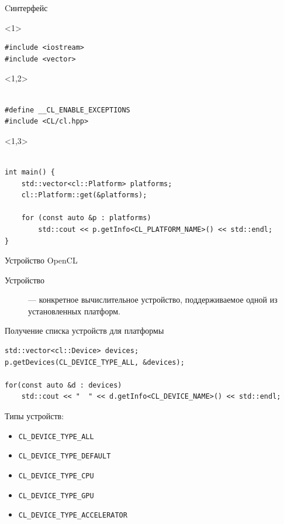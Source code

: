 \documentclass[@BEAMER_OPTIONS@]{beamer}
\newcommand{\code}[1]{\lstinline|#1|}
\newcommand{\CXX}{{\rm C}\plusplus}
\begin{document}
\begin{frame}[fragile]{\CXX интерфейс}
    \begin{exampleblock}{}
        \begin{uncoverenv}<1>
            \begin{lstlisting}
#include <iostream>
#include <vector>
            \end{lstlisting}
        \end{uncoverenv}
        \begin{uncoverenv}<1,2>
            \begin{lstlisting}[firstnumber=last]

#define __CL_ENABLE_EXCEPTIONS
#include <CL/cl.hpp>
            \end{lstlisting}
        \end{uncoverenv}
        \begin{uncoverenv}<1,3>
            \begin{lstlisting}[firstnumber=last]

int main() {
    std::vector<cl::Platform> platforms;
    cl::Platform::get(&platforms);

    for (const auto &p : platforms)
        std::cout << p.getInfo<CL_PLATFORM_NAME>() << std::endl;
}
            \end{lstlisting}
        \end{uncoverenv}
    \end{exampleblock}
\end{frame}

\begin{frame}[fragile]{Устройство OpenCL}
    \begin{description}
        \item[Устройство] --- конкретное вычислительное устройство,
            поддерживаемое одной из установленных платформ.
    \end{description}
    \begin{exampleblock}{Получение списка устройств для платформы}
        \begin{lstlisting}
std::vector<cl::Device> devices;
p.getDevices(CL_DEVICE_TYPE_ALL, &devices);

for(const auto &d : devices)
    std::cout << "  " << d.getInfo<CL_DEVICE_NAME>() << std::endl;
        \end{lstlisting}
    \end{exampleblock}
    Типы устройств:
    \begin{itemize}
        \item \code{CL_DEVICE_TYPE_ALL}
        \item \code{CL_DEVICE_TYPE_DEFAULT}
        \item \code{CL_DEVICE_TYPE_CPU}
        \item \code{CL_DEVICE_TYPE_GPU}
        \item \code{CL_DEVICE_TYPE_ACCELERATOR}
    \end{itemize}
\end{frame}
\end{document}
